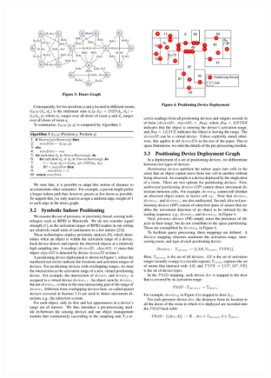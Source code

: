 \begin{frame}
\begin{columns}[c]
    \vspace{-30pt}
    \begin{figure}[tb]
      \includegraphics[width=\columnwidth]{figures/2-3/2-3-4.pdf}
    \end{figure}
    \vspace{-20pt}
    \pause
    \begin{figure}[tb]

\end{figure}
\end{columns}
\end{frame}
